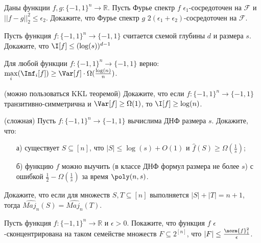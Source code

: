 
\begin{task}
    Даны функции $f, g: \{-1, 1\}^n \to \mathbb{R}$. Пусть Фурье спектр $f$ $\epsilon_1$-сосредоточен на $\mathcal{F}$ и
    $||f - g||_2^2 \le \epsilon_2$. Докажите, что Фурье спектр $g$ $2 (\epsilon_1 + \epsilon_2)$-сосредоточен на $\mathcal{F}$.
\end{task}


\begin{task}
    Пусть функция $f: \{-1, 1\}^n \to \{-1, 1\}$ считается схемой глубины $d$ и размера $s$. Докажите, что $\I[f] \le
    (\log(s))^{d - 1}$
\end{task}


\begin{theorem}[KKL]
    Для любой функции $f:\{-1, 1\}^n \to \{-1, 1\}$ верно: $\max\limits_{i} (\Inf_i[f]) \ge \Var[f] \cdot
    \Omega(\frac{\log(n)}{n})$.
\end{theorem}

\begin{task}(можно пользоваться KKL теоремой)
    Докажите, что если $f:\{-1, 1\}^n \to \{-1, 1\}$ транзитивно-симметрична и $\Var[f] \ge \Omega(1)$, то $\I[f] \ge \log(n)$. 
\end{task}


\begin{task}(сложная)
    Пусть $f:\{-1, 1\}^n \to \{-1, 1\}$ вычислима ДНФ размера $s$. Докажите, что:
   	\begin{enumerate}[topsep = 0pt, itemsep = -1ex]
        \item [а)] существует $S \subseteq [n]$, что $|S| \le \log(s) + O(1)$ и $\hat{f}(S) \ge \Omega(\frac{1}{s})$;
        \item [б)] функцию $f$ можно выучить (в классе ДНФ формул размера не более $s$) с ошибкой $\frac{1}{2} -
            \Omega(\frac{1}{s})$ за время $\poly(n, s)$.
	\end{enumerate}
\end{task}

\begin{task}
    Докажите, что если для множеств $S, T \subseteq [n]$ выполняется $|S| + |T| = n + 1$, тогда $\widehat{Maj_n}(S) =
    \widehat{Maj_n}(T)$.
\end{task}



\breakline

\begin{ptask}{21}
    Пусть функция $f: \{-1, 1\}^n \to \mathbb{R}$ и $\epsilon > 0$. Покажите, что функция $f$ $\epsilon$-сконцентрирована на таком
    семействе множеств $F \subseteq 2^{[n]}$, что $|F| \le \frac{\norm{f}_1^2}{\epsilon}$.
\end{ptask}


